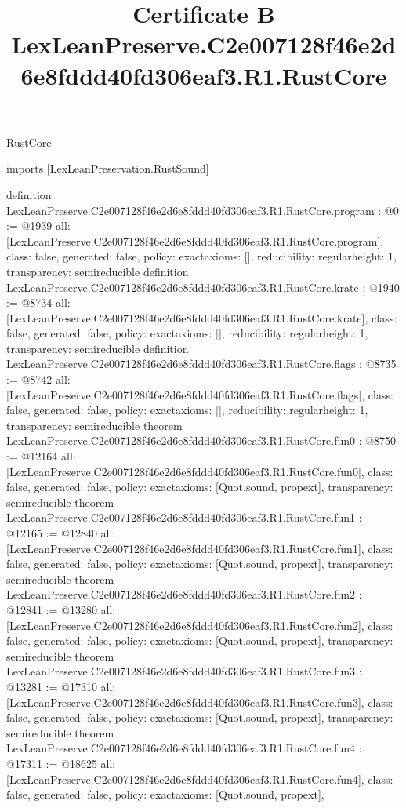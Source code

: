 \begin{lexlean}{RustCore}
\title{Certificate B LexLeanPreserve.C2e007128f46e2d6e8fddd40fd306eaf3.R1.RustCore}
\begin{coremodule}
imports [LexLeanPreservation.RustSound]

definition LexLeanPreserve.C2e007128f46e2d6e8fddd40fd306eaf3.R1.RustCore.program : @0 := @1939 {
  all: [LexLeanPreserve.C2e007128f46e2d6e8fddd40fd306eaf3.R1.RustCore.program],
  class: false,
  generated: false,
  policy: exact{axioms: []},
  reducibility: regular{height: 1},
  transparency: semireducible
}
definition LexLeanPreserve.C2e007128f46e2d6e8fddd40fd306eaf3.R1.RustCore.krate : @1940 := @8734 {
  all: [LexLeanPreserve.C2e007128f46e2d6e8fddd40fd306eaf3.R1.RustCore.krate],
  class: false,
  generated: false,
  policy: exact{axioms: []},
  reducibility: regular{height: 1},
  transparency: semireducible
}
definition LexLeanPreserve.C2e007128f46e2d6e8fddd40fd306eaf3.R1.RustCore.flags : @8735 := @8742 {
  all: [LexLeanPreserve.C2e007128f46e2d6e8fddd40fd306eaf3.R1.RustCore.flags],
  class: false,
  generated: false,
  policy: exact{axioms: []},
  reducibility: regular{height: 1},
  transparency: semireducible
}
theorem LexLeanPreserve.C2e007128f46e2d6e8fddd40fd306eaf3.R1.RustCore.fun0 : @8750 := @12164 {
  all: [LexLeanPreserve.C2e007128f46e2d6e8fddd40fd306eaf3.R1.RustCore.fun0],
  class: false,
  generated: false,
  policy: exact{axioms: [Quot.sound, propext]},
  transparency: semireducible
}
theorem LexLeanPreserve.C2e007128f46e2d6e8fddd40fd306eaf3.R1.RustCore.fun1 : @12165 := @12840 {
  all: [LexLeanPreserve.C2e007128f46e2d6e8fddd40fd306eaf3.R1.RustCore.fun1],
  class: false,
  generated: false,
  policy: exact{axioms: [Quot.sound, propext]},
  transparency: semireducible
}
theorem LexLeanPreserve.C2e007128f46e2d6e8fddd40fd306eaf3.R1.RustCore.fun2 : @12841 := @13280 {
  all: [LexLeanPreserve.C2e007128f46e2d6e8fddd40fd306eaf3.R1.RustCore.fun2],
  class: false,
  generated: false,
  policy: exact{axioms: [Quot.sound, propext]},
  transparency: semireducible
}
theorem LexLeanPreserve.C2e007128f46e2d6e8fddd40fd306eaf3.R1.RustCore.fun3 : @13281 := @17310 {
  all: [LexLeanPreserve.C2e007128f46e2d6e8fddd40fd306eaf3.R1.RustCore.fun3],
  class: false,
  generated: false,
  policy: exact{axioms: [Quot.sound, propext]},
  transparency: semireducible
}
theorem LexLeanPreserve.C2e007128f46e2d6e8fddd40fd306eaf3.R1.RustCore.fun4 : @17311 := @18625 {
  all: [LexLeanPreserve.C2e007128f46e2d6e8fddd40fd306eaf3.R1.RustCore.fun4],
  class: false,
  generated: false,
  policy: exact{axioms: [Quot.sound, propext]},
}
\end{coremodule}
\end{lexlean}
